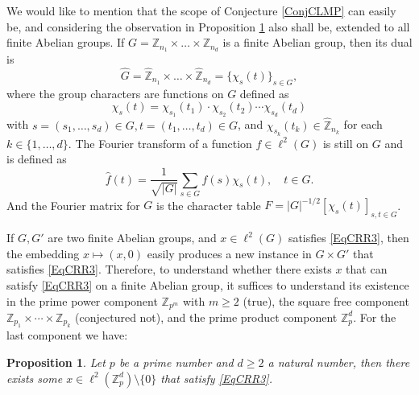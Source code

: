 \documentclass[A4,11pt]{article}
\newtheorem{Prop}{Proposition}
\begin{document}
We would like to mention that the scope of Conjecture \ref{ConjCLMP} can easily be, and considering the observation in Proposition \ref{PropZPD} also shall be, extended to all finite Abelian groups. If $G=\mathbb Z_{n_1}\times\ldots\times\mathbb Z_{n_d}$ is a finite Abelian group, then its dual is
$$\widehat G=\widehat{\mathbb Z}_{n_1}\times\ldots\times\widehat{\mathbb Z}_{n_d}=\{\chi_s(t)\}_{s\in G},$$
where the group characters are functions on $G$ defined as 
$$\chi_s(t)=\chi_{s_1}(t_1)\cdot \chi_{s_2}(t_2)\cdots\chi_{s_d}(t_d)$$ 
with $s=(s_1,\ldots, s_d)\in G, t=(t_1,\ldots, t_d)\in G$, and $\chi_{s_k}(t_k)\in\widehat{\mathbb Z}_{n_k}$ for each $k\in\{1,\ldots,d\}$. The Fourier transform of a function $f\in\ell^2(G)$ is still on $G$ and is defined as
$$\hat f(t)=\frac{1}{\sqrt{|G|}}\sum_{s\in G}f(s)\chi_s(t), \quad t\in G.$$
And the Fourier matrix for $G$ is the character table $F=|G|^{-1/2}[\chi_s(t)]_{s,t\in G}$. 

If $G,G'$ are two finite Abelian groups, and $x\in\ell^2(G)$ satisfies \eqref{EqCRR3}, then the embedding $x\mapsto (x,0)$ easily produces a new instance in $G\times G'$ that satisfies \eqref{EqCRR3}. Therefore, to understand whether there exists $x$ that can satisfy \eqref{EqCRR3} on a finite Abelian group, it suffices to understand its existence in the prime power component $\mathbb Z_{p^m}$ with $m\ge 2$ (true), the square free component $\mathbb Z_{p_1}\times\cdots\times\mathbb Z_{p_k}$ (conjectured not), and the prime product component $\mathbb Z_p^d$. For the last component we have:

\begin{Prop} \label{PropZPD}
Let $p$ be a prime number and $d\ge 2$ a natural number, then there exists some $x\in\ell^2(\mathbb Z_p^d)\setminus\{0\}$ that satisfy \eqref{EqCRR3}.
\end{Prop}
\end{document}
